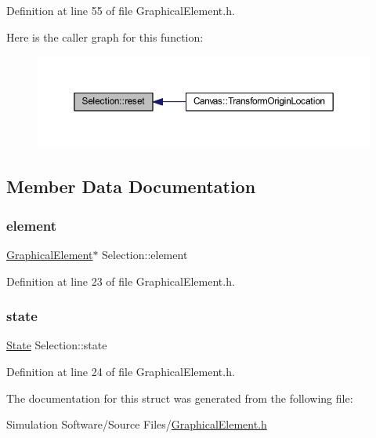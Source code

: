 Definition at line 55 of file Graphical\+Element.\+h.

Here is the caller graph for this function\+:
\nopagebreak
\begin{figure}[H]
\begin{center}
\leavevmode
\includegraphics[width=350pt]{struct_selection_a15280d931dd5c83c2ab2554254f5248d_icgraph}
\end{center}
\end{figure}


\subsection{Member Data Documentation}
\mbox{\label{struct_selection_a8bae551e7526d98cd9305069e38e8b18}} 
\subsubsection{\texorpdfstring{element}{element}}
{\footnotesize\ttfamily \hyperlink{class_graphical_element}{Graphical\+Element}$\ast$ Selection\+::element}



Definition at line 23 of file Graphical\+Element.\+h.

\mbox{\label{struct_selection_aac75790db0cfc1c96d3652999ccb3091}} 
\subsubsection{\texorpdfstring{state}{state}}
{\footnotesize\ttfamily \hyperlink{struct_selection_a908531395e550b540712fe90c8f6fe68}{State} Selection\+::state}



Definition at line 24 of file Graphical\+Element.\+h.



The documentation for this struct was generated from the following file\+:\begin{DoxyCompactItemize}
\item 
Simulation Software/\+Source Files/\hyperlink{_graphical_element_8h}{Graphical\+Element.\+h}\end{DoxyCompactItemize}
